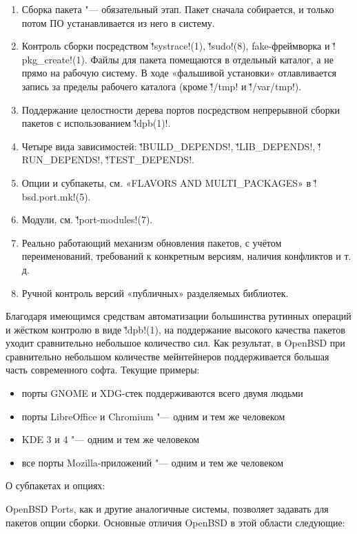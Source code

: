 \documentclass[10pt, a5paper]{article}
\begin{document}
\begin{enumerate}
  \item Сборка пакета "--- обязательный этап. Пакет сначала собирается, и только потом ПО устанавливается из него в систему.
  \item Контроль сборки посредством \v!systrace!(1), \v!sudo!(8), fake-\linebreak{}фреймворка и \v!pkg\_create!(1). Файлы для пакета помещаются в отдельный каталог, а не прямо на рабочую систему. В ходе «фальшивой установки» отлавливается запись за пределы рабочего каталога (кроме \v!/tmp! и \v!/var/tmp!).
  \item Поддержание целостности дерева портов посредством непрерывной сборки пакетов с использованием \v!dpb(1)!.
  \item Четыре вида зависимостей: \v!BUILD\_DEPENDS!, \v!LIB\_DE\-PENDS!, \v!RUN\_DEPENDS!, \v!TEST\_DEPENDS!.
  \item Опции и субпакеты, см. «FLAVORS AND MULTI\_PACKAGES» в \v!bsd.port.mk!(5).
  \item Модули, см. \v!port-modules!(7).
  \item Реально работающий механизм обновления пакетов, с учётом переименований, требований к конкретным версиям, наличия конфликтов и т.\,д.
  \item Ручной контроль версий «публичных» разделяемых библиотек.
\end{enumerate}

Благодаря имеющимся средствам автоматизации большинства рутинных операций и жёстком контролю в виде \v!dpb!(1), на поддержание высокого качества пакетов уходит сравнительно небольшое количество сил. Как результат, в OpenBSD при сравнительно небольшом количестве мейнтейнеров поддерживается большая часть современного софта. Текущие примеры:

\begin{itemize}
  \item порты GNOME и XDG-стек поддерживаются всего двумя \linebreak людьми
  \item порты LibreOffice и Chromium "--- одним и тем же человеком
  \item KDE 3 и 4 "--- одним и тем же человеком
  \item все порты Mozilla-приложений "--- одним и тем же человеком
\end{itemize}

О субпакетах и опциях:

OpenBSD Ports, как и другие аналогичные системы, позволяет задавать для пакетов опции сборки. Основные отличия OpenBSD в этой области следующие:
\end{document}
